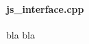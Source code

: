\documentclass[main.tex]{subfiles}
\begin{document}
    \paragraph{js\_interface.cpp} bla bla %
\end{document}
